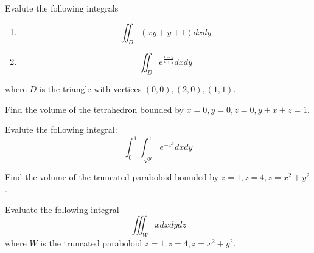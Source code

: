 \documentclass[openany]{book}
\newcommand{\R}{\mathbb{R}}
\begin{document}
\begin{prob}
    Evalute the following integrals
    \begin{enumerate}
        \item \begin{equation*}
            \iint_D (xy+y+1) dxdy
        \end{equation*}
        \item \begin{equation*}
            \iint_D e^\frac{x-y}{x+y}dxdy
        \end{equation*}
    \end{enumerate}
    where $D$ is the triangle with vertices $(0,0), (2,0), (1,1)$.
\end{prob}


\begin{prob}
    Find the volume of the tetrahedron bounded by $x=0, y=0, z=0, y+x+z=1$.
\end{prob}

\begin{prob}
    Evalute the following integral:
    \begin{equation*}
        \int_0^1\int_{\sqrt{y}}^1e^{-x^3}dxdy
    \end{equation*}
\end{prob}

\begin{prob}
    Find the volume of the truncated paraboloid bounded by $z=1, z=4, z=x^2+y^2$.
\end{prob}






\begin{prob}
    Evaluate the following integral 
    \begin{equation*}
        \iiint_W xdxdydz
    \end{equation*}
    where $W$ is the truncated paraboloid $z=1, z=4, z=x^2+y^2$.
\end{prob}
\end{document}
